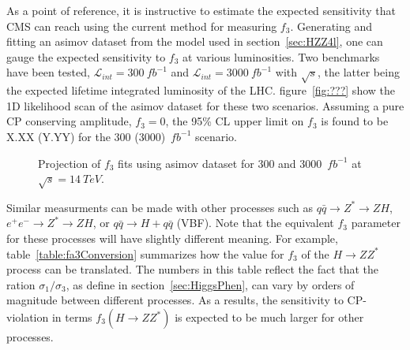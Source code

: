 As a point of reference, it is instructive to estimate the
expected sensitivity that CMS can reach using the current method
for measuring $f_3$.  Generating and fitting an asimov dataset
from the model used in section~\ref{sec:HZZ4l}, one can gauge
the expected sensitivity to $f_3$ at various luminosities.  
Two benchmarks have been tested, $\mathscr{L}_{int}=300~fb^{-1}$
 and $\mathscr{L}_{int}=3000~fb^{-1}$ with $\sqrt{s}$, the latter
being the expected lifetime integrated luminosity of the LHC. 
figure~\ref{fig:???} show the 1D likelihood scan of the asimov
dataset for these two scenarios.  Assuming a pure CP conserving 
amplitude, $f_3=0$, the 95\% CL upper limit on $f_3$ is found to
be X.XX (Y.YY) for the 300 (3000)~$fb^{-1}$ scenario.  

\begin{figure}
\begin{center}
\label{fig:fa3Projections}
\caption{Projection of $f_3$ fits using asimov dataset for 
300 and 3000~$fb^{-1}$ at $\sqrt{s}=14~TeV$.}
\end{center}
\end{figure}

Similar measurments can be made with other processes such as
$q\bar{q}\to Z^*\to ZH$, $e^+e^-\to Z^*\to ZH$, or
$q\bar{q}\to H+q\bar{q}$ (VBF).  Note that the equivalent 
$f_3$ parameter for these processes will have slightly different 
meaning.  For example, table~\ref{table:fa3Conversion} summarizes
how the value for $f_3$ of the $H\to ZZ^*$ process can be 
translated.  The numbers in this table reflect the fact that 
the ration $\sigma_1/\sigma_3$, as define in 
section~\ref{sec:HiggsPhen}, can vary by orders of magnitude
between different processes.  As a results, the
sensitivity to CP-violation in terms $f_3(H\to ZZ^*)$ is
expected to be much larger for other processes.  

